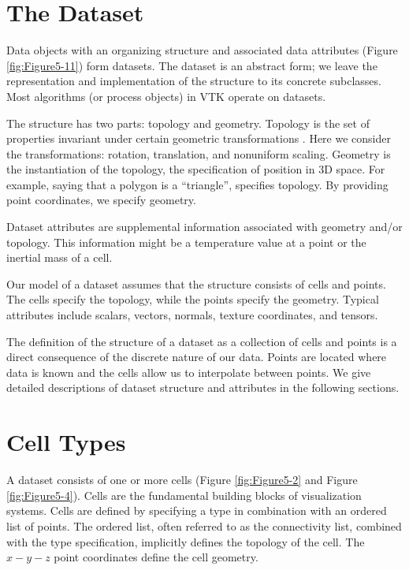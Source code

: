 \section{The Dataset}

Data objects with an organizing structure and associated data attributes (Figure \ref{fig:Figure5-11}) form datasets. The dataset is an abstract form; we leave the representation and implementation of the structure to its concrete subclasses. Most algorithms (or process objects) in VTK operate on datasets.

The structure has two parts: topology and geometry. Topology is the set of properties invariant under certain geometric transformations \cite{Weiler86}. Here we consider the transformations: rotation, translation, and nonuniform scaling. Geometry is the instantiation of the topology, the specification of position in 3D space. For example, saying that a polygon is a ``triangle'', specifies topology. By providing point coordinates, we specify geometry.

Dataset attributes are supplemental information associated with geometry and/or topology. This information might be a temperature value at a point or the inertial mass of a cell.

Our model of a dataset assumes that the structure consists of cells and points. The cells specify the topology, while the points specify the geometry. Typical attributes include scalars, vectors, normals, texture coordinates, and tensors.

The definition of the structure of a dataset as a collection of cells and points is a direct consequence of the discrete nature of our data. Points are located where data is known and the cells allow us to interpolate between points. We give detailed descriptions of dataset structure and attributes in the following sections.

\section{Cell Types}

A dataset consists of one or more cells (Figure \ref{fig:Figure5-2} and Figure \ref{fig:Figure5-4}). Cells are the fundamental building blocks of visualization systems. Cells are defined by specifying a type in combination with an ordered list of points. The ordered list, often referred to as the connectivity list, combined with the type specification, implicitly defines the topology of the cell. The $x-y-z$ point coordinates define the cell geometry.

